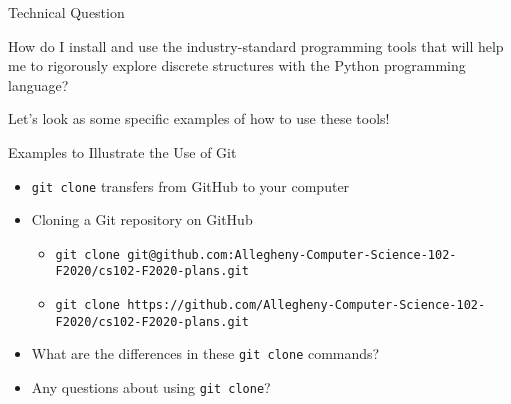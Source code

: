 \documentclass[14pt,aspectratio=169]{beamer}
\begin{document}
%
\begin{frame}{Technical Question}
  \begin{center}
    {\large How do I install and use the industry-standard programming tools that will
      help me to rigorously explore discrete structures with the Python
    programming language?}
  \end{center}
  \vspace{2ex}
  \begin{center}
    \small Let's look as some specific examples of how to use these tools!
  \end{center}
\end{frame}

%
\begin{frame}{Examples to Illustrate the Use of Git}
  \begin{itemize}
    \item {\tt git clone} transfers from GitHub to your computer
    \item Cloning a Git repository on GitHub
      {\scriptsize
        \begin{itemize}
          \item {\tt git clone git@github.com:Allegheny-Computer-Science-102-F2020/cs102-F2020-plans.git}
          \item {\tt git clone https://github.com/Allegheny-Computer-Science-102-F2020/cs102-F2020-plans.git}
        \end{itemize}
      }
    \item What are the differences in these {\tt git clone} commands?
    \item Any questions about using {\tt git clone}?
  \end{itemize}
\end{frame}
\end{document}
